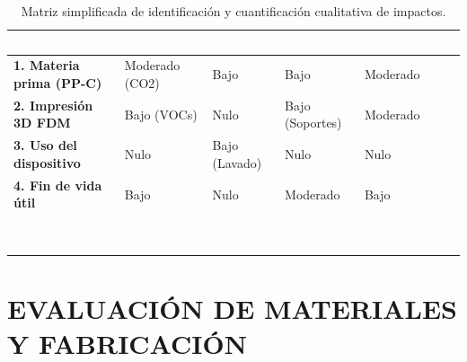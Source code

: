 \documentclass[11pt,a4paper]{article}
\begin{document}
\begin{table}[H]
    \centering
    \small
    \renewcommand{\arraystretch}{1.6}
    \renewcommand{\tabularxcolumn}[1]{m{#1}}
    \begin{tabularx}{\linewidth}{|>{\bfseries}m{3.5cm}|>{\centering\arraybackslash}X|>{\centering\arraybackslash}X|>{\centering\arraybackslash}X|>{\centering\arraybackslash}X|}
        \hline
        \rowcolor{ArthroNavy}
        \textcolor{white}{\textbf{Fase / Vector}} & \textcolor{white}{\textbf{Atmósfera}} & \textcolor{white}{\textbf{Agua}} & \textcolor{white}{\textbf{Residuos}} & \textcolor{white}{\textbf{Energía}} \\ \hline
        1. Materia prima (PP-C) & Moderado (CO2) & Bajo & Bajo & Moderado \\ \hline
        \rowcolor{ArthroTeal!5}
        2. Impresión 3D FDM & Bajo (VOCs) & Nulo & Bajo (Soportes) & Moderado \\ \hline
        3. Uso del dispositivo & Nulo & Bajo (Lavado) & Nulo & Nulo \\ \hline
        \rowcolor{ArthroTeal!5}
        4. Fin de vida útil & Bajo & Nulo & Moderado & Bajo \\ \hline
        \rowcolor{ArthroNavy}
        \textcolor{white}{\textbf{Impacto Global}} & \textcolor{white}{\textbf{BAJO}} & \textcolor{white}{\textbf{MUY BAJO}} & \textcolor{white}{\textbf{BAJO}} & \textcolor{white}{\textbf{MODERADO}} \\ \hline
    \end{tabularx}
    \caption{Matriz simplificada de identificación y cuantificación cualitativa de impactos.}
    \label{tab:matriz_impactos}
\end{table}
\newpage
\section{EVALUACIÓN DE MATERIALES Y FABRICACIÓN}
\end{document}
